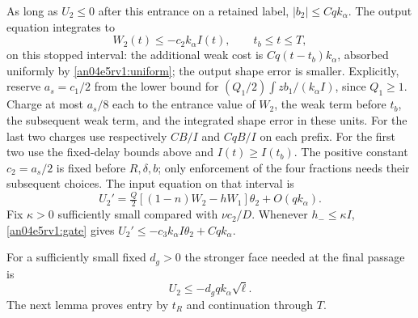 \documentclass[11pt]{article}
\begin{document}
As long as $U_2\le0$ after this entrance on a retained label,
$|b_2|\le Cq k_\alpha$. The output equation integrates to
\begin{equation}
 W_2(t)\le -c_2 k_\alpha I(t),\qquad t_b\le t\le T,
 \label{an04e5rv1:wnegative}
\end{equation}
on this stopped interval: the additional weak cost is $Cq(t-t_b)k_\alpha$,
absorbed uniformly by \eqref{an04e5rv1:uniform}; the output shape error is
smaller. Explicitly, reserve $a_s=c_1/2$ from the lower bound for $(Q_1/2)\int z b_1/(k_\alpha I)$, since $Q_1\ge1$. Charge at most $a_s/8$ each to the entrance value of $W_2$, the weak term before $t_b$, the subsequent weak term, and the integrated shape error in these units. For the last two charges use respectively $CB/I$ and $CqB/I$ on each prefix. For the first two use the fixed-delay bounds above and $I(t)\ge I(t_b)$. The positive constant $c_2=a_s/2$ is fixed before $R,\delta,b$; only enforcement of the four fractions needs their subsequent choices. The input equation on that interval is
\begin{equation}
 U_2'=\tfrac Q2[(1-n)W_2-hW_1]\theta_2+O(qk_\alpha).
 \label{an04e5rv1:gate}
\end{equation}
Fix $\kappa>0$ sufficiently small compared with $\nu c_2/D$.
Whenever $h_-\le\kappa I$, \eqref{an04e5rv1:gate} gives
$U_2'\le-c_3 k_\alpha I\theta_2+Cq k_\alpha$.

For a sufficiently small fixed $d_g>0$ the stronger face needed at the final passage is
\begin{equation}\label{an04e5rv1:deepgate}
 U_2\le -d_g q k_\alpha\sqrt\ell .
\end{equation}
The next lemma proves entry by $t_R$ and continuation through $T$.
\end{document}
